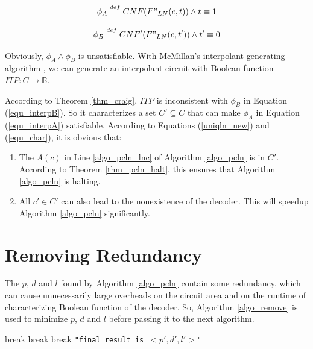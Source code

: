 \documentclass[journal]{IEEEtran}
\begin{document}
\begin{equation}\label{equ_interpA}
\phi_A\stackrel{def}{=}CNF(F"_{LN}(c,t))\wedge t\equiv 1
\end{equation}

\begin{equation}\label{equ_interpB}
\phi_B\stackrel{def}{=}CNF'(F"_{LN}(c,t'))\wedge t'\equiv 0
\end{equation}

Obviously,
$\phi_A\wedge \phi_B$ is unsatisfiable.
With McMillan's interpolant generating algorithm \cite{interp_McMillan},
we can generate an interpolant circuit with Boolean function $ITP:C\to \mathbb{B}$.

According to Theorem \ref{thm_craig},
$ITP$ is inconsistent with $\phi_B$ in Equation (\ref{equ_interpB}).
So it characterizes a set $C'\subseteq C$ that can make $\phi_A$ in Equation (\ref{equ_interpA}) satisfiable.
According to Equations (\ref{uniqln_new}) and (\ref{equ_char}),
it is obvious that:
\begin{enumerate}
 \item The $A(c)$ in Line \ref{algo_pcln_lnc} of Algorithm \ref{algo_pcln} is in $C'$.
According to Theorem \ref{thm_pcln_halt},
this ensures that Algorithm \ref{algo_pcln} is halting.
 \item All $c'\in C'$ can also lead to the nonexistence of the decoder.
This will speedup Algorithm \ref{algo_pcln} significantly.
\end{enumerate}

\section{Removing Redundancy}\label{sec_rmred}

The $p$, $d$ and $l$ found by Algorithm \ref{algo_pcln} contain some redundancy,
which can cause unnecessarily large overheads on the circuit area and on the runtime of characterizing Boolean function of the decoder.
So,
Algorithm \ref{algo_remove} is used to minimize $p$, $d$ and $l$ before passing it to the next algorithm.

\begin{algorithm}
\caption{$RemoveRedundancy(p,d,l,R)$}
\label{algo_remove}
\begin{algorithmic}[1]
    \STATE break
  \ENDIF
\ENDFOR
{}
    \STATE break
  \ENDIF
\ENDFOR
{}
    \STATE break
  \ENDIF
\ENDFOR
\PRINT \texttt{"final result is $<p',d',l'>$"}
\end{algorithmic}
\end{algorithm}
\end{document}
